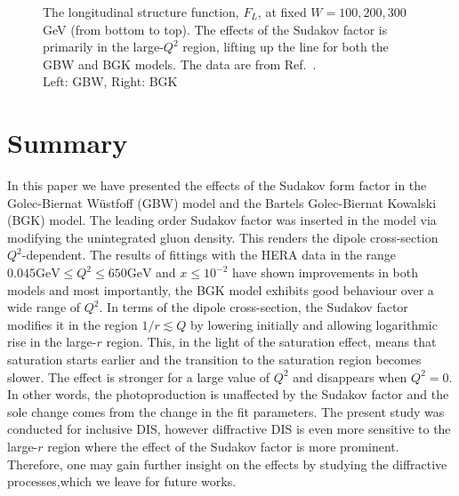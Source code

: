 \documentclass[11pt]{article}
\begin{document}
\begin{figure}[H]
\caption{The longitudinal structure function, $F_L$, at fixed $W=100, 200, 300$ GeV (from bottom to top).
The effects of the Sudakov factor is primarily in the large-$Q^2$ region, lifting up the line for both the GBW and BGK models.
The data are from Ref.~\cite{FL}.\\
Left: GBW, Right: BGK}
\label{fig:FL}
\end{figure}

\section{Summary}
In this paper we have presented the effects of the Sudakov form factor in the Golec-Biernat W\"ustfoff (GBW) model and the Bartels Golec-Biernat Kowalski (BGK) model. 
The leading order Sudakov factor was inserted in the model via modifying the unintegrated gluon density. This renders the dipole cross-section $Q^2$-dependent.
The results of fittings with the HERA data in the range $0.045\mathrm{GeV} \leq Q^2 \leq 650\mathrm{GeV}$ and $x\leq 10^{-2}$ have shown improvements in both models and most importantly, the BGK model exhibits good behaviour over a wide range of $Q^2$.  In terms of the dipole cross-section, the Sudakov factor modifies it in the region $1/r\lesssim Q$ by lowering initially and allowing logarithmic rise in the large-$r$ region.  This, in the light of the saturation effect, means that saturation starts earlier and the transition to the saturation region becomes slower. The effect is stronger for a large value of $Q^2$ and disappears when $Q^2=0$. In other words, the photoproduction is unaffected by the Sudakov factor and the sole change comes from the change in the fit parameters. The present study was conducted for inclusive DIS, however diffractive DIS is {\color{blue}even} more sensitive to the large-$r$ region where the effect of the Sudakov factor is more prominent. Therefore, one may gain further insight on the effects by studying the diffractive processes,which we leave for future works.
\end{document}

